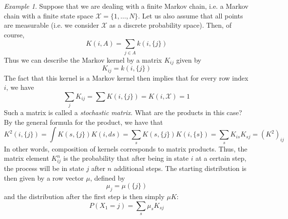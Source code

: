 \documentclass[a4paper, draft]{article}
\theoremstyle{own}
\theoremstyle{remark}
\newtheorem{example}{Example}[section]
\begin{document}
\begin{example}
Suppose that we are dealing with a finite Markov chain, i.e. a Markov chain with a finite state space ${\mathcal X} = \{1, \dots, N\}$. Let us also assume that all points are measurable (i.e. we consider ${\mathcal X}$ as a discrete probability space). Then, of course,
$$
K(i,A) = \sum_{j \in A} k(i, \{j\})
$$
Thus we can describe the Markov kernel by a matrix $K_{ij}$ given by
$$
K_{ij} = k(i, \{ j \})
$$
The fact that this kernel is a Markov kernel then implies that for every row index $i$, we have
$$
\sum_j K_{ij} = \sum K(i,\{j\}) = K(i,{\mathcal X}) = 1
$$
Such a matrix is called a {\em stochastic matrix}. What are the products in this case? By the general formula for the product, we have that
$$
K^2(i,\{j\}) = \int K(s,\{j\}) K(i,ds) = \sum_s K(s,\{j\}) K(i,\{s\}) = \sum_s K_{is}K_{sj} = (K^2)_{ij}
$$
In other words, composition of kernels corresponds to matrix products. Thus, the matrix element $K^n_{ij}$ is the probability that after being in state $i$ at a certain step, the process will be in state $j$ after $n$ additional steps. The starting distribution is then given by a row vector $\mu$, defined by
$$
\mu_j = \mu(\{j\})
$$
and the distribution after the first step is then simply $\mu K$:
$$
P(X_1 = j) = \sum_s \mu_s K_{sj}
$$
\end{example}
\end{document}
